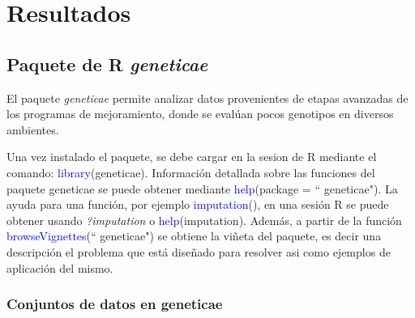 \chapter{Resultados}

\section{Paquete de R \emph{geneticae}}

El paquete \emph{geneticae} permite analizar datos provenientes de etapas avanzadas de los programas de mejoramiento, donde se evalúan pocos genotipos en diversos ambientes. 

Una vez instalado el paquete, se debe cargar en la sesion de R mediante el comando: \textcolor{blue}{library}(geneticae). Información detallada sobre las funciones del paquete geneticae se puede obtener mediante \textcolor{blue}{help}(package = `` geneticae"). La ayuda para una función, por ejemplo \textcolor{blue}{imputation}(), en una sesión R se puede obtener usando \emph{?imputation} o \textcolor{blue}{help}(imputation). Además, a partir de la función \textcolor{blue}{browseVignettes}(`` geneticae") se obtiene la viñeta del paquete, es decir una descripción el problema que está diseñado para resolver asi como ejemplos de aplicación del mismo.

\subsection{Conjuntos de datos en geneticae}

